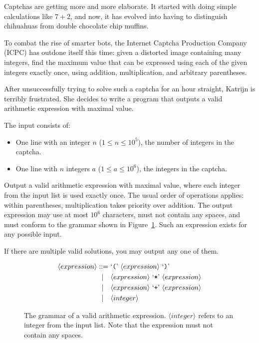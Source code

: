 
%
Captchas are getting more and more elaborate.
It started with doing simple calculations like $7 + 2$, and now, it has evolved into having to distinguish chihuahuas from double chocolate chip muffins.

To combat the rise of smarter bots, the Internet Captcha Production Company (ICPC) has outdone itself this time:
given a distorted image containing many integers, find the maximum value that can be expressed using each of the given integers exactly once, using addition, multiplication, and arbitrary parentheses.

After unsuccessfully trying to solve such a captcha for an hour straight, Katrijn is terribly frustrated.
She decides to write a program that outputs a valid arithmetic expression with maximal value.

\begin{Input}
  The input consists of:
  \begin{itemize}
    \item One line with an integer $n$ ($1 \le n \le 10^5$), the number of integers in the captcha.
    \item One line with $n$ integers $a$ ($1 \le a \le 10^6$), the integers in the captcha.
  \end{itemize}
\end{Input}

\begin{Output}
  Output a valid arithmetic expression with maximal value, where each integer from the input list is used exactly once.
  The usual order of operations applies: within parentheses, multiplication takes priority over addition.
  The output expression may use at most $10^6$ characters, must not contain any spaces, and must conform to the grammar shown in Figure~\ref{fig:higher-grammar}.
  Such an expression exists for any possible input.

  If there are multiple valid solutions, you may output any one of them.

  \begin{figure}[h]
    \newcommand\expr{\langle expression \rangle}
    \newcommand\integer{\langle integer \rangle}
    \newcommand\lit[1]{\text{`\texttt{#1}'}}
    \begin{align*}
      \expr ::= ~ & \lit{(}~\expr~\lit{)} \\
            | ~~~ & \expr~\lit{*}~\expr \\
            | ~~~ & \expr~\lit{+}~\expr \\
            | ~~~ & \integer \\
    \end{align*}
    \caption{
      The grammar of a valid arithmetic expression.
      $\integer$ refers to an integer from the input list.
      Note that the expression must not contain any spaces.
    }
    \label{fig:higher-grammar}
  \end{figure}
\end{Output}
